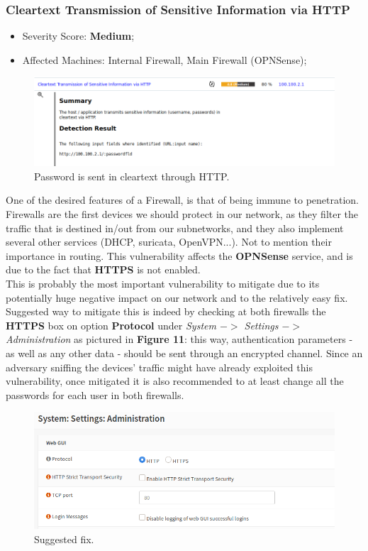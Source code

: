 \subsubsection{Cleartext Transmission of Sensitive Information via HTTP}
\begin{itemize}
\item Severity Score: \textbf{Medium};
\item Affected Machines: Internal Firewall, Main Firewall (OPNSense);
\end{itemize}
\begin{figure}[!htb]
\centering
\begin{minipage}{.5\textwidth}
  \centering
  \includegraphics[width=1\textwidth]{clearTextHTTPfirewallVuln.png}
  \caption[a]{Password is sent in cleartext through HTTP.}\label{fig:10}
\end{minipage}%
\end{figure}

One of the desired features of a Firewall, is that of being immune to penetration. Firewalls are the first devices we should protect in our network, as they filter the traffic that is destined in/out from our subnetworks, and they also implement several other services (DHCP, suricata, OpenVPN...). Not to mention their importance in routing. This vulnerability affects the \textbf{OPNSense} service, and is due to the fact that \textbf{HTTPS} is not enabled.\\
This is probably the most important vulnerability to mitigate due to its potentially huge negative impact on our network and to the relatively easy fix.\\
Suggested way to mitigate this is indeed by checking at both firewalls the \textbf{HTTPS} box on option \textbf{Protocol} under \textit{System $->$ Settings $->$ Administration} as pictured in \textbf{Figure 11}: this way, authentication parameters - as well as any other data - should be sent through an encrypted channel. Since an adversary sniffing the devices' traffic might have already exploited this vulnerability, once mitigated it is also recommended to at least change all the passwords for each user in both firewalls.

\begin{figure}[!htb]
\centering
\begin{minipage}{.5\textwidth}
  \centering
  \includegraphics[width=1\textwidth]{vulnerabilityToMitigate.png}
  \caption[a]{Suggested fix.}\label{fig:11}
\end{minipage}%
\end{figure}
